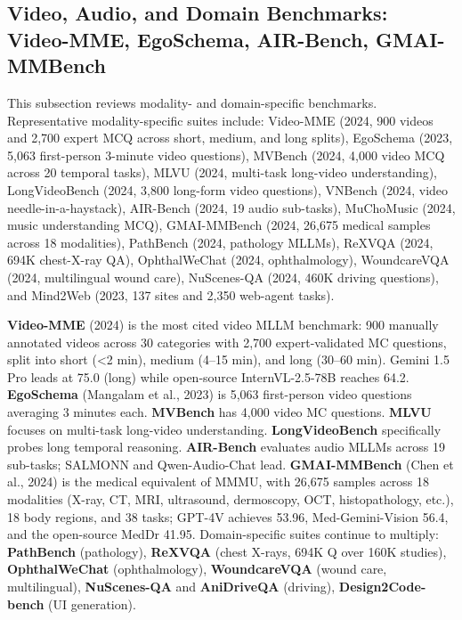 \subsection{Video, Audio, and Domain Benchmarks: Video-MME, EgoSchema, AIR-Bench, GMAI-MMBench}\label{video-audio-and-domain-benchmarks-video-mme-egoschema-air-bench-gmai-mmbench}

This subsection reviews modality- and domain-specific benchmarks. Representative modality-specific suites include: Video-MME (2024, 900 videos and 2,700 expert MCQ across short, medium, and long splits), EgoSchema (2023, 5,063 first-person 3-minute video questions), MVBench (2024, 4,000 video MCQ across 20 temporal tasks), MLVU (2024, multi-task long-video understanding), LongVideoBench (2024, 3,800 long-form video questions), VNBench (2024, video needle-in-a-haystack), AIR-Bench (2024, 19 audio sub-tasks), MuChoMusic (2024, music understanding MCQ), GMAI-MMBench (2024, 26,675 medical samples across 18 modalities), PathBench (2024, pathology MLLMs), ReXVQA (2024, 694K chest-X-ray QA), OphthalWeChat (2024, ophthalmology), WoundcareVQA (2024, multilingual wound care), NuScenes-QA (2024, 460K driving questions), and Mind2Web (2023, 137 sites and 2,350 web-agent tasks).

\textbf{Video-MME} (2024) is the most cited video MLLM benchmark: 900 manually annotated videos across 30 categories with 2,700 expert-validated MC questions, split into short (\textless2 min), medium (4--15 min), and long (30--60 min). Gemini 1.5 Pro leads at 75.0 (long) while open-source InternVL-2.5-78B reaches 64.2. \textbf{EgoSchema} (Mangalam et al., 2023) is 5,063 first-person video questions averaging 3 minutes each. \textbf{MVBench} has 4,000 video MC questions. \textbf{MLVU} focuses on multi-task long-video understanding. \textbf{LongVideoBench} specifically probes long temporal reasoning. \textbf{AIR-Bench} evaluates audio MLLMs across 19 sub-tasks; SALMONN and Qwen-Audio-Chat lead. \textbf{GMAI-MMBench} (Chen et al., 2024) is the medical equivalent of MMMU, with 26,675 samples across 18 modalities (X-ray, CT, MRI, ultrasound, dermoscopy, OCT, histopathology, etc.), 18 body regions, and 38 tasks; GPT-4V achieves 53.96, Med-Gemini-Vision 56.4, and the open-source MedDr 41.95. Domain-specific suites continue to multiply: \textbf{PathBench} (pathology), \textbf{ReXVQA} (chest X-rays, 694K Q over 160K studies), \textbf{OphthalWeChat} (ophthalmology), \textbf{WoundcareVQA} (wound care, multilingual), \textbf{NuScenes-QA} and \textbf{AniDriveQA} (driving), \textbf{Design2Code-bench} (UI generation).

